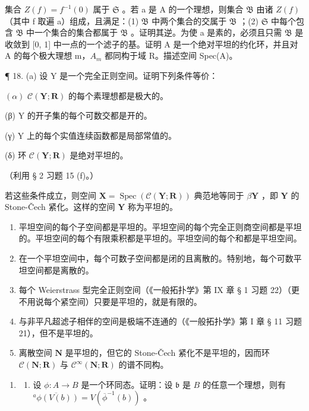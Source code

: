 集合 \(Z(f) = f^{-1}(0)\) 属于 \(\mathfrak{S}\) 。若 a 是 A 的一个理想，则集合 \(\mathfrak{B}\) 由诸 \(Z(f)\) （其中 f 取遍 a）组成，且满足：(1) \(\mathfrak{B}\) 中两个集合的交属于 \(\mathfrak{B}\) ；(2) \(\mathfrak{S}\) 中每个包含 \(\mathfrak{B}\) 中一个集合的集合都属于 \(\mathfrak{B}\) 。证明其逆。为使 a 是素的，必须且只需 \(\mathfrak{B}\) 是收敛到 {[}0, 1{]} 中一点的一个滤子的基。证明 A 是一个绝对平坦的约化环，并且对 A 的每个极大理想 m，\(A_{m}\) 都同构于域 R。描述空间 Spec(A)。

¶ 18. (a) 设 Y 是一个完全正则空间。证明下列条件等价：

\((\alpha)\) \(\mathcal{C}(\mathbf{Y};\mathbf{R})\) 的每个素理想都是极大的。

(β) Y 的开子集的每个可数交都是开的。

(γ) Y 上的每个实值连续函数都是局部常值的。

(δ) 环 \(\mathcal{C}(\mathbf{Y};\mathbf{R})\) 是绝对平坦的。

（利用 § 2 习题 15 (f)。）

若这些条件成立，则空间 \(\mathbf{X} = \operatorname{Spec}(\mathcal{C}(\mathbf{Y};\mathbf{R}))\) 典范地等同于 \(\beta \mathbf{Y}\) ，即 \(\mathbf{Y}\) 的 Stone-Čech 紧化。这样的空间 \(\mathbf{Y}\) 称为平坦的。

\begin{enumerate}
\def\labelenumi{(\alph{enumi})}
\setcounter{enumi}{1}
\item
  平坦空间的每个子空间都是平坦的。平坦空间的每个完全正则商空间都是平坦的。平坦空间的每个有限乘积都是平坦的。平坦空间的每个和都是平坦空间。
\item
  在一个平坦空间中，每个可数子空间都是闭的且离散的。特别地，每个可数平坦空间都是离散的。
\item
  每个 Weierstrass 型完全正则空间（《一般拓扑学》第 IX 章 § 1 习题 22）（更不用说每个紧空间）只要是平坦的，就是有限的。
\item
  与非平凡超滤子相伴的空间是极端不连通的（《一般拓扑学》第 I 章 § 11 习题 21），但不是平坦的。
\item
  离散空间 \(\mathbf{N}\) 是平坦的，但它的 Stone-Čech 紧化不是平坦的，因而环 \(\mathcal{C}(\mathbf{N};\mathbf{R})\) 与 \(\mathcal{C}^{\infty}(\mathbf{N};\mathbf{R})\) 的谱不同构。
\end{enumerate}

\begin{enumerate}
\def\labelenumi{\arabic{enumi}.}
\setcounter{enumi}{18}
\tightlist
\item
  \begin{enumerate}
  \def\labelenumii{(\alph{enumii})}
  \tightlist
  \item
    设 \(\phi: A \to B\) 是一个环同态。证明：设 \(\mathfrak{b}\) 是 \(B\) 的任意一个理想，则有 \(\overline{^a\phi(V(b))} = V(\overline{\phi}^{-1}(b))\) 。
  \end{enumerate}
\end{enumerate}


